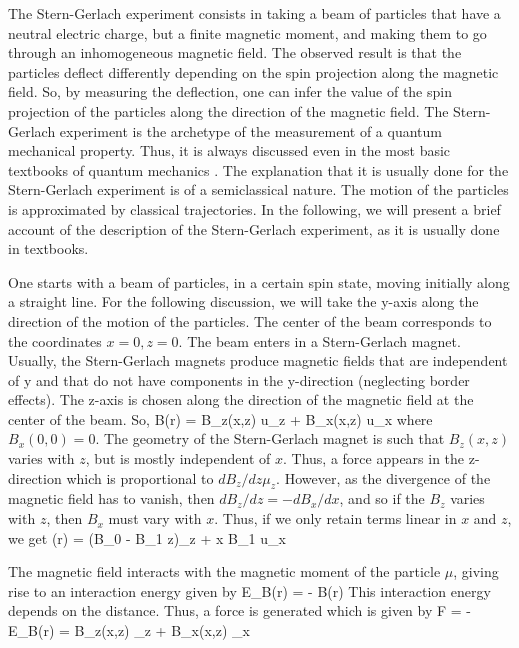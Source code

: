 The Stern-Gerlach experiment consists in taking a beam of particles
that have a neutral electric charge, but a finite magnetic moment, and
making them to go through an inhomogeneous magnetic field. The observed
result is that the particles deflect differently depending on the spin
projection along the magnetic field. So, by measuring the deflection, one can
infer the value of the spin projection of the particles along the direction 
of the magnetic field. The Stern-Gerlach experiment 
is the archetype of the measurement of a 
quantum mechanical property. Thus, it is always discussed even in the most 
basic textbooks of quantum mechanics \cite{eis}.
The explanation  that it is usually done for the Stern-Gerlach
experiment is of a semiclassical nature.  The motion of the particles 
is approximated by classical trajectories. In the following, we will present
a brief account of the description of the Stern-Gerlach experiment, as it is
usually done in textbooks.

One starts with a beam of 
particles, in a certain spin state, moving initially along a straight line. 
For the following discussion, 
we will take the y-axis along the direction of the motion of the particles.
The center of the beam corresponds to the coordinates $x=0, z=0$.
The beam enters in a Stern-Gerlach magnet.
Usually, the Stern-Gerlach magnets produce magnetic fields that are independent
of y  and that do not have components in the
y-direction (neglecting border effects). 
The z-axis is chosen along the direction of the magnetic field at the 
center of the beam. So,
\be
\vec B(\vec r) = B_z(x,z) \hat u_z + B_x(x,z) \hat u_x
\ee
where $B_x(0,0)=0$.
The geometry of the Stern-Gerlach magnet is such that $B_z(x,z)$ varies with 
 $z$, but is mostly independent of $x$. Thus, a force appears in 
the z-direction which is proportional
to $dB_z/dz \mu_z$. However, as the divergence of 
the magnetic field has to vanish, then $dB_z/dz=-dB_x/dx$, and so if the
$B_z$ varies with  $z$, then $B_x$ must vary with  $x$. Thus, if we only retain
terms linear in $x$ and $z$, we get
\be
{}(\vec r) = (B_0 - B_1 z)_z + x B_1 \hat u_x
\ee

The magnetic field interacts with the magnetic moment of the
particle $\mu$, giving rise to an interaction energy given by
\be
E_B(\vec r) = - \vec B(\vec r) \cdot \vec \mu
\ee
This interaction energy depends on the distance. Thus, a  force is generated
which is given by
\be
\vec F = -\grad E_B(\vec r) = \grad B_z(x,z) \mu_z + \grad B_x(x,z) \mu_x
\label{Fzx}
\ee


